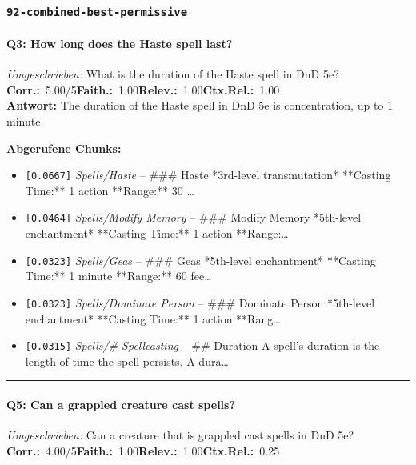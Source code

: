 \subsubsection*{\texttt{92-combined-best-permissive}}
\label{app:samples:92_combined_best_permissive}

\paragraph{Q3: How long does the Haste spell last?}
\textit{Umgeschrieben:} What is the duration of the Haste spell in DnD 5e?\\[2pt]
\noindent \textbf{Corr.:}~5.00/5\quad \textbf{Faith.:}~1.00\quad \textbf{Relev.:}~1.00\quad \textbf{Ctx.Rel.:}~1.00\\

\noindent\textbf{Antwort:} The duration of the Haste spell in DnD 5e is concentration, up to 1 minute.

\noindent\textbf{Abgerufene Chunks:}
\begin{itemize}[noitemsep, topsep=2pt]
  \item[\textbf{\#1}] \texttt{[0.0667]} \textit{Spells/Haste} -- \#\#\# Haste  *3rd-level transmutation*  **Casting Time:** 1 action  **Range:** 30 \ldots
  \item[\textbf{\#2}] \texttt{[0.0464]} \textit{Spells/Modify Memory} -- \#\#\# Modify Memory  *5th-level enchantment*  **Casting Time:** 1 action  **Range:\ldots
  \item[\textbf{\#3}] \texttt{[0.0323]} \textit{Spells/Geas} -- \#\#\# Geas  *5th-level enchantment*  **Casting Time:** 1 minute  **Range:** 60 fee\ldots
  \item[\textbf{\#4}] \texttt{[0.0323]} \textit{Spells/Dominate Person} -- \#\#\# Dominate Person  *5th-level enchantment*  **Casting Time:** 1 action  **Rang\ldots
  \item[\textbf{\#5}] \texttt{[0.0315]} \textit{Spells/# Spellcasting} -- \#\# Duration  A spell's duration is the length of time the spell persists. A dura\ldots
\end{itemize}
\vspace{4pt}
\hrule
\vspace{6pt}

\paragraph{Q5: Can a grappled creature cast spells?}
\textit{Umgeschrieben:} Can a creature that is grappled cast spells in DnD 5e?\\[2pt]
\noindent \textbf{Corr.:}~4.00/5\quad \textbf{Faith.:}~1.00\quad \textbf{Relev.:}~1.00\quad \textbf{Ctx.Rel.:}~0.25\\

